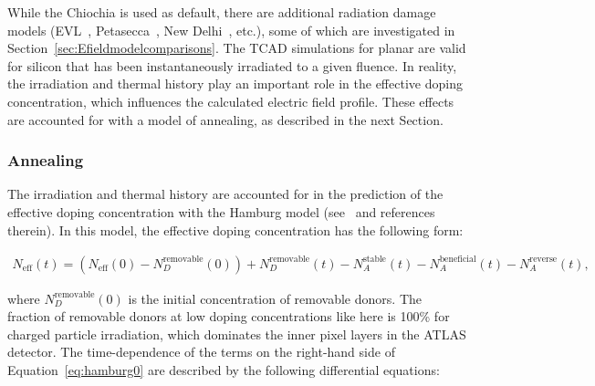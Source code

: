 

While the Chiochia is used as default, there are additional radiation damage models (EVL~\cite{bib:DP}, Petasecca~\cite{1710302}, New Delhi~\cite{dalal2014simulation}, etc.), some of which are investigated in Section~\ref{sec:Efieldmodelcomparisons}.  The TCAD simulations for planar  are valid for silicon that has been instantaneously irradiated to a given fluence.   In reality, the irradiation and thermal history play an important role in the effective doping concentration, which influences the calculated electric field profile.  These effects are accounted for with a model of annealing, as described in the next Section.


\subsubsection{Annealing}
\label{sec:annealing}

 The irradiation and thermal history are accounted for in the prediction of the effective doping concentration with the Hamburg model (see~\cite{moll-thesis} and references therein).  In this model, the effective doping concentration has the following form:

\begin{align}
\label{eq:hamburg0}
N_\text{eff}(t)=(N_\text{eff}(0)-N_{D}^\text{removable}(0))+N_{D}^\text{removable}(t)-N_{A}^\text{stable}(t)-N_{A}^\text{beneficial}(t)-N_{A}^\text{reverse}(t),
\end{align}

where $N_D^\text{removable}(0)$ is the initial concentration of removable donors.  The fraction of removable donors at low doping concentrations like here is 100\% for charged particle irradiation, which dominates the inner pixel layers in the ATLAS detector.  The time-dependence of the terms on the right-hand side of Equation~\ref{eq:hamburg0} are described by the following differential equations:

